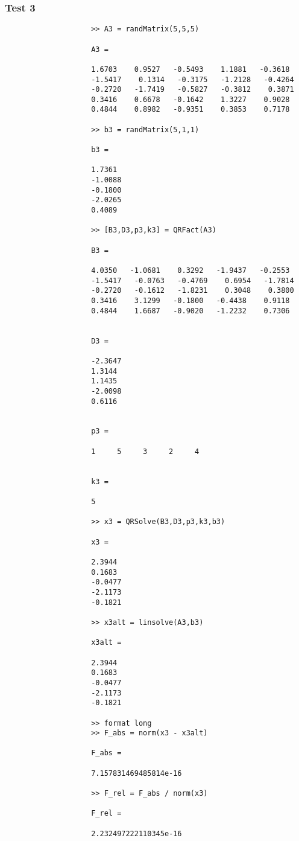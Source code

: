 \documentclass[11pt,titlepage]{article}
\begin{document}
			\subsubsection{Test 3}
				\begin{lstlisting}
					>> A3 = randMatrix(5,5,5)
					
					A3 =
					
					1.6703    0.9527   -0.5493    1.1881   -0.3618
					-1.5417    0.1314   -0.3175   -1.2128   -0.4264
					-0.2720   -1.7419   -0.5827   -0.3812    0.3871
					0.3416    0.6678   -0.1642    1.3227    0.9028
					0.4844    0.8982   -0.9351    0.3853    0.7178
					
					>> b3 = randMatrix(5,1,1)
					
					b3 =
					
					1.7361
					-1.0088
					-0.1800
					-2.0265
					0.4089
					
					>> [B3,D3,p3,k3] = QRFact(A3)
					
					B3 =
					
					4.0350   -1.0681    0.3292   -1.9437   -0.2553
					-1.5417   -0.0763   -0.4769    0.6954   -1.7814
					-0.2720   -0.1612   -1.8231    0.3048    0.3800
					0.3416    3.1299   -0.1800   -0.4438    0.9118
					0.4844    1.6687   -0.9020   -1.2232    0.7306
					
					
					D3 =
					
					-2.3647
					1.3144
					1.1435
					-2.0098
					0.6116
					
					
					p3 =
					
					1     5     3     2     4
					
					
					k3 =
					
					5
					
					>> x3 = QRSolve(B3,D3,p3,k3,b3)
					
					x3 =
					
					2.3944
					0.1683
					-0.0477
					-2.1173
					-0.1821
					
					>> x3alt = linsolve(A3,b3)
					
					x3alt =
					
					2.3944
					0.1683
					-0.0477
					-2.1173
					-0.1821
					
					>> format long
					>> F_abs = norm(x3 - x3alt)
					
					F_abs =
					
					7.157831469485814e-16
					
					>> F_rel = F_abs / norm(x3)
					
					F_rel =
					
					2.232497222110345e-16
				\end{lstlisting}
\end{document}
